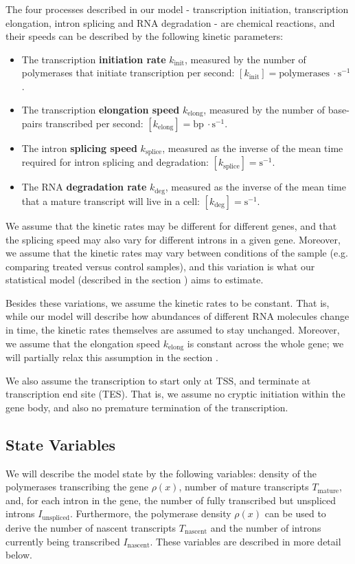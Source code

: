 \documentclass[11pt]{article}
\begin{document}
    The four processes described in our model - transcription initiation, transcription elongation, intron splicing and RNA degradation - are chemical reactions, and their speeds can be described by the following kinetic parameters:
    \begin{itemize}
        \item The transcription \textbf{initiation rate} $k_{\mathrm{init}}$, measured by the number of polymerases that initiate transcription per second: $\left[ k_{\mathrm{init}} \right]= \mathrm{polymerases}\ \cdot \mathrm{s}^{-1}$.
        \item The transcription \textbf{elongation speed} $k_{\mathrm{elong}}$, measured by the number of base-pairs transcribed per second: $\left[ k_{\mathrm{elong}} \right]= \mathrm{bp}\ \cdot \mathrm{s}^{-1}$.
        \item The intron \textbf{splicing speed} $k_{\mathrm{splice}}$, measured as the inverse of the mean time required for intron splicing and degradation: $\left[ k_{\mathrm{splice}} \right]= \mathrm{s}^{-1}$.

        \item The RNA \textbf{degradation rate} $k_{\mathrm{deg}}$, measured as the inverse of the mean time that a mature transcript will live in a cell: $\left[ k_{\mathrm{deg}} \right]= \mathrm{s}^{-1}$.
    \end{itemize}
    We assume that the kinetic rates may be different for different genes, and that the splicing speed may also vary for different introns in a given gene. Moreover, we assume that the kinetic rates may vary between conditions of the sample (e.g. comparing treated versus control samples), and this variation is what our statistical model (described in the section ) aims to estimate.

    Besides these variations, we assume the kinetic rates to be constant. That is, while our model will describe how abundances of different RNA molecules change in time, the kinetic rates themselves are assumed to stay unchanged. Moreover, we assume that the elongation speed $k_{\mathrm{elong}}$ is constant across the whole gene; we will partially relax this assumption in the section .

    We also assume the transcription to start only at TSS, and terminate at transcription end site (TES). That is, we assume no cryptic initiation within the gene body, and also no premature termination of the transcription.

    \subsection{State Variables}
    We will describe the model state by the following variables: density of the polymerases transcribing the gene $\rho(x)$, number of mature transcripts $T_{\mathrm{mature}}$, and, for each intron in the gene, the number of fully transcribed but unspliced introns $I_{\mathrm{unspliced}}$. Furthermore, the polymerase density $\rho(x)$ can be used to derive the number of nascent transcripts $T_{\mathrm{nascent}}$ and the number of introns currently being transcribed $I_{\mathrm{nascent}}$. These variables are described in more detail below.
\end{document}
